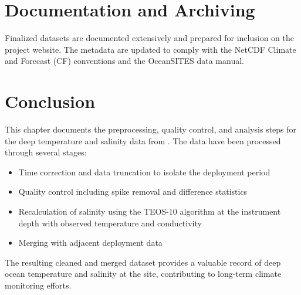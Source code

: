\section{Documentation and Archiving}
Finalized datasets are documented extensively and prepared for inclusion on the project website. 
The metadata are updated to comply with the NetCDF Climate and Forecast (CF) conventions and the OceanSITES data manual.

\section{Conclusion}
This chapter documents the preprocessing, quality control, and analysis steps 
for the deep temperature and salinity data from \displayprojectname{} \casenumber{}. 
The data have been processed through several stages:

\begin{itemize}
    \item Time correction and data truncation to isolate the deployment period
    \item Quality control including spike removal and difference statistics
    \item Recalculation of salinity using the TEOS-10 algorithm at the instrument depth with observed temperature and conductivity
    \item Merging with adjacent deployment data %
\end{itemize}

The resulting cleaned and merged dataset provides a valuable record of deep ocean temperature and salinity 
at the \displayprojectname{} site, contributing to long-term climate monitoring efforts.